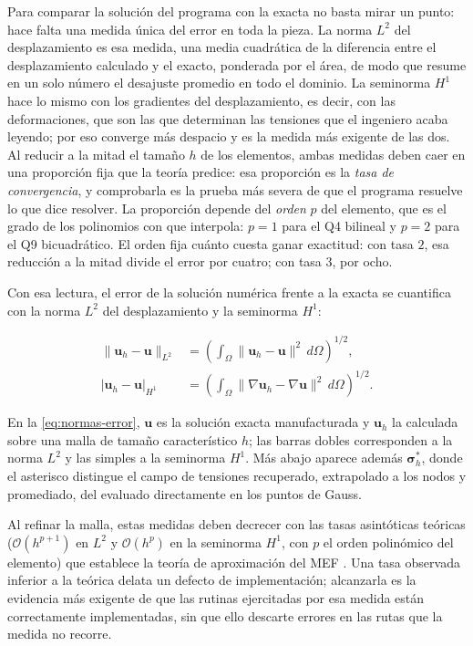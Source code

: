 Para comparar la solución del programa con la exacta no basta mirar un punto: hace falta una medida única del error en toda la pieza. La norma $L^2$ del desplazamiento es esa medida, una media cuadrática de la diferencia entre el desplazamiento calculado y el exacto, ponderada por el área, de modo que resume en un solo número el desajuste promedio en todo el dominio. La seminorma $H^1$ hace lo mismo con los gradientes del desplazamiento, es decir, con las deformaciones, que son las que determinan las tensiones que el ingeniero acaba leyendo; por eso converge más despacio y es la medida más exigente de las dos. Al reducir a la mitad el tamaño $h$ de los elementos, ambas medidas deben caer en una proporción fija que la teoría predice: esa proporción es la \emph{tasa de convergencia}, y comprobarla es la prueba más severa de que el programa resuelve lo que dice resolver. La proporción depende del \emph{orden} $p$ del elemento, que es el grado de los polinomios con que interpola: $p = 1$ para el Q4 bilineal y $p = 2$ para el Q9 bicuadrático. El orden fija cuánto cuesta ganar exactitud: con tasa $2$, esa reducción a la mitad divide el error por cuatro; con tasa $3$, por ocho.

Con esa lectura, el error de la solución numérica frente a la exacta se cuantifica con la norma $L^2$ del desplazamiento y la seminorma $H^1$:

\begin{equation}
\begin{aligned}
\|\bm{u}_h - \bm{u}\|_{L^2} &= \left( \int_\Omega \|\bm{u}_h - \bm{u}\|^2 \, d\Omega \right)^{1/2}, \\
|\bm{u}_h - \bm{u}|_{H^1} &= \left( \int_\Omega \|\nabla\bm{u}_h - \nabla\bm{u}\|^2 \, d\Omega \right)^{1/2}.
\end{aligned}
\label{eq:normas-error}
\end{equation}

En la \autoref{eq:normas-error}, $\bm{u}$ es la solución exacta manufacturada y $\bm{u}_h$ la calculada sobre una malla de tamaño característico $h$; las barras dobles corresponden a la norma $L^2$ y las simples a la seminorma $H^1$. Más abajo aparece además $\bm{\sigma}^*_h$, donde el asterisco distingue el campo de tensiones recuperado, extrapolado a los nodos y promediado, del evaluado directamente en los puntos de Gauss.

Al refinar la malla, estas medidas deben decrecer con las tasas asintóticas teóricas ($\mathcal{O}(h^{p+1})$ en $L^2$ y $\mathcal{O}(h^p)$ en la seminorma $H^1$, con $p$ el orden polinómico del elemento) que establece la teoría de aproximación del MEF \autocites[pp.~106-107]{strang2008analysis}[pp.~189-190]{hughes2000fem}. Una tasa observada inferior a la teórica delata un defecto de implementación; alcanzarla es la evidencia más exigente de que las rutinas ejercitadas por esa medida están correctamente implementadas, sin que ello descarte errores en las rutas que la medida no recorre.

